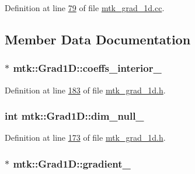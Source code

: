 Definition at line \hyperlink{mtk__grad__1d_8cc_source_l00079}{79} of file \hyperlink{mtk__grad__1d_8cc_source}{mtk\-\_\-grad\-\_\-1d.\-cc}.



\subsection{Member Data Documentation}
\hypertarget{classmtk_1_1Grad1D_a2395861161c26f237e892aacebcc1909}{
\subsubsection[{coeffs\-\_\-interior\-\_\-}]{$\ast$ mtk\-::\-Grad1\-D\-::coeffs\-\_\-interior\-\_\-\hspace{0.3cm}{\ttfamily [private]}}}\label{classmtk_1_1Grad1D_a2395861161c26f237e892aacebcc1909}


Definition at line \hyperlink{mtk__grad__1d_8h_source_l00183}{183} of file \hyperlink{mtk__grad__1d_8h_source}{mtk\-\_\-grad\-\_\-1d.\-h}.

\hypertarget{classmtk_1_1Grad1D_abe8eaf4f5c451f82c062daaef31e9e6a}{
\subsubsection[{dim\-\_\-null\-\_\-}]{\setlength{\rightskip}{0pt plus 5cm}int mtk\-::\-Grad1\-D\-::dim\-\_\-null\-\_\-\hspace{0.3cm}{\ttfamily [private]}}}\label{classmtk_1_1Grad1D_abe8eaf4f5c451f82c062daaef31e9e6a}


Definition at line \hyperlink{mtk__grad__1d_8h_source_l00173}{173} of file \hyperlink{mtk__grad__1d_8h_source}{mtk\-\_\-grad\-\_\-1d.\-h}.

\hypertarget{classmtk_1_1Grad1D_a024b84b1ea285c0c590eb42d40ff4469}{
\subsubsection[{gradient\-\_\-}]{$\ast$ mtk\-::\-Grad1\-D\-::gradient\-\_\-\hspace{0.3cm}{\ttfamily [private]}}}\label{classmtk_1_1Grad1D_a024b84b1ea285c0c590eb42d40ff4469}


